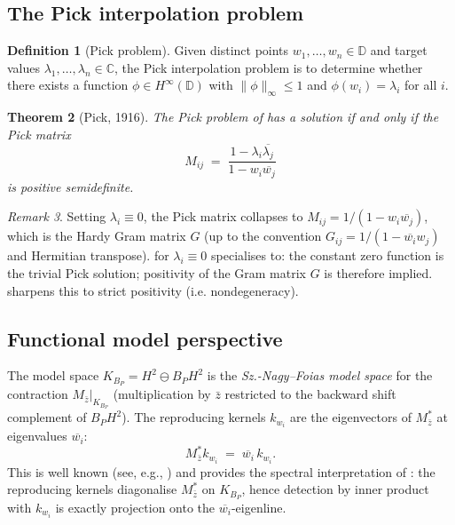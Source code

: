 \documentclass[12pt]{article}
\newtheorem{theorem}{Theorem}[section]
\theoremstyle{definition}
\newtheorem{definition}[theorem]{Definition}
\theoremstyle{remark}
\newtheorem{remark}[theorem]{Remark}
\newcommand{\C}{\mathbb{C}}
\newcommand{\D}{\mathbb{D}}
\newcommand{\HHH}{H^{2}}
\newcommand{\KBP}{K_{B_{P}}}
\newcommand{\norm}[1]{\lVert #1 \rVert}
\newcommand{\conj}[1]{\overline{#1}}
\begin{document}
\subsection{The Pick interpolation problem}

\begin{definition}[Pick problem]\label{def:pick-problem}
Given distinct points $w_{1},\dots,w_{n}\in\D$ and target values
$\lambda_{1},\dots,\lambda_{n}\in\C$, the Pick interpolation problem is
to determine whether there exists a function $\phi\in H^{\infty}(\D)$
with $\norm{\phi}_{\infty}\le1$ and $\phi(w_{i})=\lambda_{i}$ for all
$i$.
\end{definition}

\begin{theorem}[Pick, 1916]\label{thm:pick-theorem}
The Pick problem of  has a solution if and only if
the Pick matrix
\[
  M_{ij}\;=\;\frac{1-\lambda_{i}\conj{\lambda_{j}}}{1-w_{i}\conj{w_{j}}}
\]
is positive semidefinite.
\end{theorem}

\begin{remark}\label{rem:pick-vs-gram}
Setting $\lambda_{i}\equiv0$, the Pick matrix collapses to
$M_{ij}=1/(1-w_{i}\conj{w_{j}})$, which is the Hardy Gram matrix $G$
(up to the convention $G_{ij}=1/(1-\conj{w_{i}}w_{j})$ and Hermitian
transpose).  for $\lambda_{i}\equiv0$ specialises
to: the constant zero function is the trivial Pick solution; positivity
of the Gram matrix $G$ is therefore implied. 
sharpens this to strict positivity (i.e. nondegeneracy).
\end{remark}

\subsection{Functional model perspective}

The model space $\KBP=\HHH\ominus B_{P}\HHH$ is the
\emph{Sz.-Nagy--Foias model space} for the contraction
$M_{\bar z}|_{\KBP}$ (multiplication by $\bar z$ restricted to the
backward shift complement of $B_{P}\HHH$). The reproducing kernels
$k_{w_{i}}$ are the eigenvectors of $M_{\bar z}^{*}$ at eigenvalues
$\conj{w_{i}}$:
\[
  M_{\bar z}^{*}k_{w_{i}}\;=\;\conj{w_{i}}\,k_{w_{i}}.
\]
This is well known (see, e.g., \cite[Ch.~5]{Garcia}) and provides the
spectral interpretation of : the
reproducing kernels diagonalise $M_{\bar z}^{*}$ on $\KBP$, hence
detection by inner product with $k_{w_{i}}$ is exactly projection onto
the $\conj{w_{i}}$-eigenline.
\end{document}
